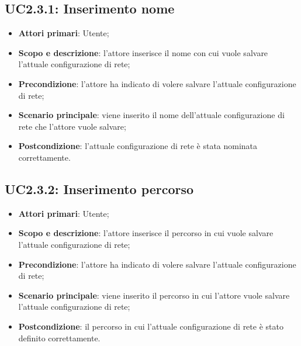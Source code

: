 \subsection{UC2.3.1: Inserimento nome} 
\hypertarget{UC2.3.1}{} 
\begin{itemize} 
	\item{\textbf{Attori primari}: Utente;} 
	\item{\textbf{Scopo e descrizione}: l'attore inserisce il nome con cui vuole salvare l'attuale configurazione di rete;} 
	\item{\textbf{Precondizione}: l'attore ha indicato di volere salvare l'attuale configurazione di rete;}
	\item{\textbf{Scenario principale}: viene inserito il nome dell'attuale configurazione di rete che l'attore vuole salvare;}
	\item{\textbf{Postcondizione}: l'attuale configurazione di rete è stata nominata correttamente.}
\end{itemize} 

\subsection{UC2.3.2: Inserimento percorso} 
\hypertarget{UC2.3.2}{} 
\begin{itemize} 
	\item{\textbf{Attori primari}: Utente;} 
	\item{\textbf{Scopo e descrizione}: l'attore inserisce il percorso in cui vuole salvare l'attuale configurazione di rete;} 
	\item{\textbf{Precondizione}: l'attore ha indicato di volere salvare l'attuale configurazione di rete;}
	\item{\textbf{Scenario principale}: viene inserito il percorso in cui l'attore vuole salvare l'attuale configurazione di rete;} 
	\item{\textbf{Postcondizione}: il percorso in cui l'attuale configurazione di rete è stato definito correttamente.}
\end{itemize}

